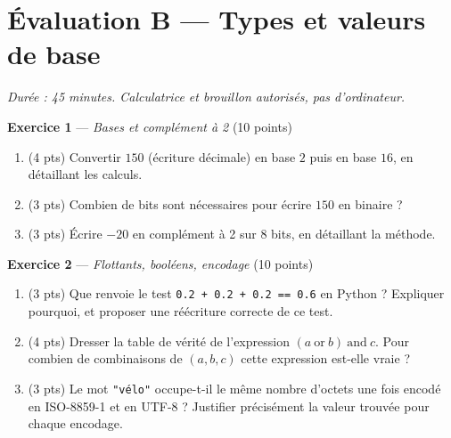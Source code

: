 \section*{Évaluation B --- Types et valeurs de base}
\textit{Durée : 45 minutes. Calculatrice et brouillon autorisés, pas d'ordinateur.}


\bigskip

\textbf{Exercice 1} --- \textit{Bases et complément à 2} \hfill (10 points)

\begin{enumerate}
  \item (4 pts) Convertir $150$ (écriture décimale) en base $2$ puis en base $16$, en détaillant les calculs.
  \item (3 pts) Combien de bits sont nécessaires pour écrire $150$ en binaire ?
  \item (3 pts) Écrire $-20$ en complément à 2 sur $8$ bits, en détaillant la méthode.
\end{enumerate}


\bigskip

\textbf{Exercice 2} --- \textit{Flottants, booléens, encodage} \hfill (10 points)

\begin{enumerate}
  \item (3 pts) Que renvoie le test \lstinline{0.2 + 0.2 + 0.2 == 0.6} en Python ? Expliquer pourquoi, et proposer une réécriture correcte de ce test.
  \item (4 pts) Dresser la table de vérité de l'expression $(a\ \text{or}\ b)\ \text{and}\ c$. Pour combien de combinaisons de $(a,b,c)$ cette expression est-elle vraie ?
  \item (3 pts) Le mot \lstinline{"vélo"} occupe-t-il le même nombre d'octets une fois encodé en ISO-8859-1 et en UTF-8 ? Justifier précisément la valeur trouvée pour chaque encodage.
\end{enumerate}

